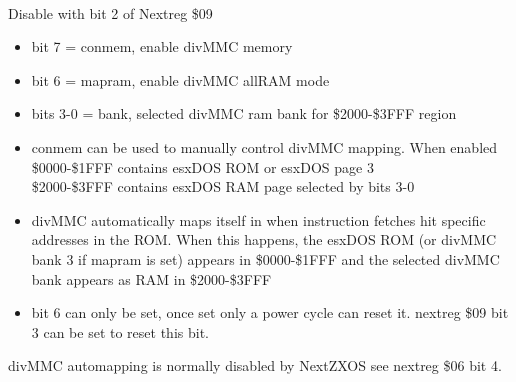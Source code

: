 \\     
Disable with bit 2 of Nextreg \$09
\begin{itemize}
\item[] bit 7 = conmem, enable divMMC memory
\item[] bit 6 = mapram, enable divMMC allRAM mode
\item[] bits 3-0 = bank, selected divMMC ram bank for \$2000-\$3FFF region
\item conmem can be used to manually control divMMC mapping. When enabled\\
\$0000-\$1FFF contains esxDOS ROM or esxDOS page 3\\
\$2000-\$3FFF contains esxDOS RAM page selected by bits 3-0
\item divMMC automatically maps itself in when instruction fetches hit
specific addresses in the ROM. When this happens, the esxDOS ROM (or divMMC
bank 3 if mapram is set) appears in \$0000-\$1FFF and the selected divMMC
bank appears as RAM in \$2000-\$3FFF
\item bit 6 can only be set, once set only a power cycle can reset it.
nextreg \$09 bit 3 can be set to reset this bit.
\end{itemize}
divMMC automapping is normally disabled by NextZXOS see nextreg \$06 bit 4.\\
